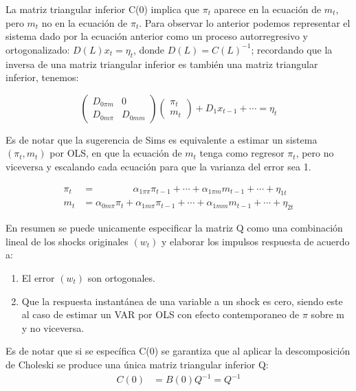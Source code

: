 \documentclass[
]{book}
\providecommand{\tightlist}{%
  \setlength{\itemsep}{0pt}\setlength{\parskip}{0pt}}
\begin{document}
La matriz triangular inferior C(0) implica que \(\pi_{t}\) aparece en la ecuación de \(m_{t}\), pero \(m_{t}\) no en la ecuación de \(\pi_{t}\). Para observar lo anterior podemos representar el sistema dado por la ecuación anterior como un proceso autorregresivo y ortogonalizado: \(D(L)x_{t}=\eta_{t}\), donde \(D(L)=C(L)^{-1}\); recordando que la inversa de una matriz triangular inferior es también una matriz triangular inferior, tenemos:

\begin{equation}
      \left( \begin{array}{cc}
      D_{0\pi m} & 0\\
      D_{0m \pi} & D_{0mm}
      \end{array}
      \right)
      \left( \begin{array}{c}
      \pi_{t} \\
       m_{t} 
      \end{array}\right)+D_{1}x_{t-1}+\cdots=\eta_{t}\nonumber
\end{equation}

Es de notar que la sugerencia de Sims es equivalente a estimar un sistema \((\pi_{t}, m_{t})\) por OLS, en que la ecuación de \(m_{t}\) tenga como regresor \(\pi_{t}\), pero no viceversa y escalando cada ecuación para que la varianza del error sea 1.

\begin{align}
\pi_{t}&=\;\;\;\;\;\;\;\;\;\;\;\;\;\;\alpha_{1\pi \pi}\pi_{t-1}+\cdots+\alpha_{1\pi m}m_{t-1}+\cdots+\eta_{1t}\nonumber \\
m_{t}&=\alpha_{0m \pi}\pi_{t}+\alpha_{1m \pi}\pi_{t-1}+\cdots+\alpha_{1mm}m_{t-1}+\cdots +\eta_{2t}\nonumber
\end{align}

En resumen se puede unicamente especificar la matriz Q como una combinación lineal de los shocks originales \((w_{t})\) y elaborar los impulsos respuesta de acuerdo a:

\begin{enumerate}
\def\labelenumi{\arabic{enumi}.}
\tightlist
\item
  El error \((w_{t})\) son ortogonales.
\item
  Que la respuesta instantánea de una variable a un shock es cero, siendo este al caso de estimar un VAR por OLS con efecto contemporaneo de \(\pi\) sobre m y no viceversa.
\end{enumerate}

Es de notar que si se específica C(0) se garantiza que al aplicar la descomposición de Choleski se produce una única matriz triangular inferior Q:
\begin{align}
C(0)&=B(0)Q^{-1}=Q^{-1} \nonumber\\
\end{align}
\end{document}
